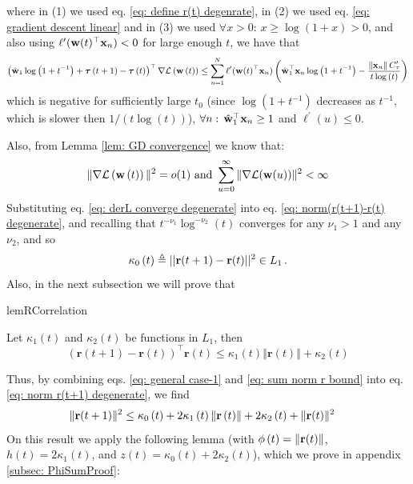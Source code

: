\documentclass[twoside,11pt,english]{article}
\begin{document}
where in (1) we used eq. \ref{eq: define r(t) degenrate}, in (2)
we used eq. \ref{eq: gradient descent linear} and in (3) we used
$\forall x>0:\,x\geq\log\left(1+x\right)>0$, and also using $\ell^{\prime}(\mathbf{w}(t)^{\top}\mathbf{x}_{n})<0$ for large enough $t$, we have that 
\begin{equation}\small
\left(\hat{\mathbf{w}}_{1}\log\left(1+t^{-1}\right)+\boldsymbol{\tau}\left(t+1\right)-\boldsymbol{\tau}\left(t\right)\right)^\top\nabla\mathcal{L}\left(\mathbf{w}\left(t\right)\right)\le\sum_{n=1}^{N}\ell'(\mathbf{w}(t)^{\top}\mathbf{x}_{n})\left(\hat{\mathbf{w}}_{1}^{\top}\mathbf{x}_{n}\log\left(1+t^{-1}\right)-\frac{\left\Vert \mathbf{x}_{n}\right\Vert C_{\tau}^{\prime}}{t\log\left(t\right)}\right)
\end{equation}
which is negative for sufficiently large $t_{0}$ (since $\log\left(1+t^{-1}\right)$
decreases as $t^{-1}$, which is slower then $1/\left(t\log\left(t\right)\right)$),
$\forall n:\,\hat{\mathbf{w}}_{1}^{\top}\mathbf{x}_{n}\ge1$ and $\ell^{\prime}(u)\leq0$.

Also, from Lemma \ref{lem: GD convergence} we know that: 
\begin{equation}
\Vert\nabla\mathcal{L}\left(\mathbf{w}\left(t\right)\right)\Vert^{2}=o(1)\text{ and }\sum_{u=0}^{\infty}\Vert\nabla\mathcal{L}(\mathbf{w}(u))\Vert^{2}<\infty\label{eq: derL converge degenerate}
\end{equation}
Substituting eq. \ref{eq: derL converge degenerate} into eq. \ref{eq: norm(r(t+1)-r(t) degenerate},
and recalling that $t^{-\nu_{1}}\log^{-\nu_{2}}\left(t\right)$ converges
for any $\nu_{1}>1$ and any $\nu_{2}$, and so
\begin{equation}
\kappa_{0}\left(t\right)\triangleq||\mathbf{r}(t+1)-\mathbf{r}(t)||^{2}\in L_{1}\,.\label{eq: sum norm r bound}
\end{equation}
Also, in the next subsection we will prove that

\begin{restatable}{lemR}{Correlation}

\label{lem: r correlation}Let $\kappa_{1}\left(t\right)$ and $\kappa_{2}\left(t\right)$
be functions in $L_{1}$, then 
\begin{equation}
\left(\mathbf{r}\left(t+1\right)-\mathbf{r}\left(t\right)\right)^{\top}\mathbf{r}\left(t\right)\leq\kappa_{1}\left(t\right)\left\Vert \mathbf{r}\left(t\right)\right\Vert +\kappa_{2}\left(t\right)\label{eq: general case-1}
\end{equation}

\end{restatable}
Thus, by combining eqs. \ref{eq: general case-1} and \ref{eq: sum norm r bound}
into eq. \ref{eq: norm r(t+1) degenerate}, we find 
\begin{align*}
\Vert\mathbf{r}(t+1)\Vert^{2} & \leq\kappa_{0}\left(t\right)+2\kappa_{1}\left(t\right)\left\Vert \mathbf{r}\left(t\right)\right\Vert +2\kappa_{2}\left(t\right)+\Vert\mathbf{r}(t)\Vert^{2}
\end{align*}
On this result we apply the following lemma (with $\phi\left(t\right)=\Vert\mathbf{r}(t)\Vert$,
$h\left(t\right)=2\kappa_{1}\left(t\right)$, and $z\left(t\right)=\kappa_{0}\left(t\right)+2\kappa_{2}\left(t\right)$), which we prove in appendix \ref{subsec: PhiSumProof}: 
\end{document}
